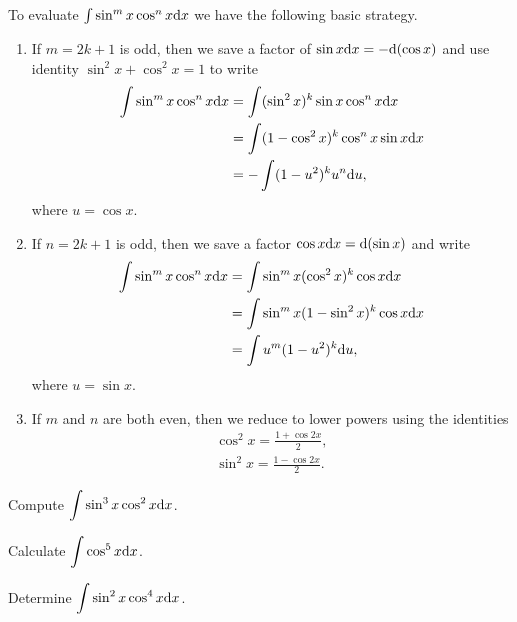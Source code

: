 

\begin{remark}
To evaluate $\int \sin^m x\cos^n x\mathrm{d} x$ we have the following basic strategy.
\begin{enumerate}
\item If $m=2k+1$ is odd, then we save a factor of $\sin x\mathrm{d} x = -\mathrm{d}(\cos x)$ and use identity $\sin^2 x + \cos^2 x = 1$ to write
\begin{equation*}
\begin{split}
\int \sin^m x \cos^n x\mathrm{d} x &= \int (\sin^2 x)^k\sin x\cos^n x\mathrm{d} x \\
&= \int (1-\cos^2 x)^k\cos^n x\sin x\mathrm{d} x\\
& = -\int (1-u^2)^ku^n\mathrm{d} u,
\end{split}
\end{equation*}
where $u=\cos x$.
\item If $n=2k+1$ is odd, then we save a factor $\cos x\mathrm{d} x = \mathrm{d}(\sin x)$ and write
\begin{equation*}
\begin{split}
\int \sin^m x \cos^n x\mathrm{d} x &= \int\sin^m x(\cos^2 x)^k\cos x\mathrm{d} x \\
&= \int\sin^m x(1-\sin^2 x)^k\cos x\mathrm{d} x \\
&= \int u^m(1-u^2)^k\mathrm{d} u,
\end{split}
\end{equation*}
where $u=\sin x$.
\item If $m$ and $n$ are both even, then we reduce to lower powers using the identities
\begin{align*}
\cos^2 x = \frac{1+\cos 2x}{2},\\
\sin^2 x = \frac{1-\cos 2x}{2}.
\end{align*}
\end{enumerate}
\end{remark}

\begin{example}
Compute $\displaystyle\int\sin^3 x\cos^2 x\mathrm{d} x$.
\end{example}

\newpage

\begin{example}
Calculate $\displaystyle\int\cos^5 x\mathrm{d} x$.
\end{example}
\vfill

\begin{example}
Determine $\displaystyle\int\sin^2 x\cos^4 x\mathrm{d} x$.
\end{example}
\vfill

